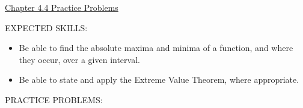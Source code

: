 \documentclass[12pt]{article}
\begin{document}
\begin{center}
\underline{\LARGE{Chapter 4.4 Practice Problems}}
\end{center}

\noindent EXPECTED SKILLS:

\begin{itemize}

\item Be able to find the absolute maxima and minima of a function, and where they occur, over a given interval.

\item Be able to state and apply the Extreme Value Theorem, where appropriate.

\end{itemize}

\noindent PRACTICE PROBLEMS:

\medskip
\end{document}
